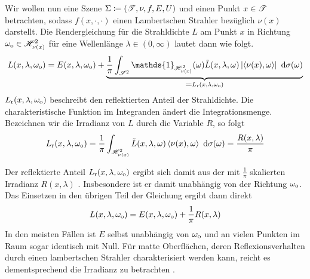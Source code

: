 		Wir wollen nun eine Szene $\Sigma\coloneqq(\mathscr{T},\nu,f,E,U)$ und einen Punkt $x\in\mathscr{T}$ betrachten, sodass $f(x,\cdot,\cdot)$ einen Lambertschen Strahler bezüglich $\nu(x)$ darstellt.
		Die Rendergleichung für die Strahldichte $L$ am Punkt $x$ in Richtung $\omega_{\mathrm{o}}\in\mathscr{H}^{2}_{\nu(x)}$ für eine Wellenlänge $\lambda\in(0,\infty)$ lautet dann wie folgt.
		\[
			L(x,\lambda,\omega_\m{o}) = E(x,\lambda,\omega_\m{o}) + \underbrace{\frac{1}{\pi} \integral{\ssp}{}{\mathds{1}_{\shs{\nu(x)}}(\omega) \tilde{L}(x,\lambda,\omega) \abs{\dotp{\nu(x)}{\omega}} }{\sigma(\omega)}}_{\definedby L_\m{r}(x,\lambda,\omega_\m{o})}
		\]
		$L_{\mathrm{r}}(x,\lambda,\omega_{\mathrm{o}})$ beschreibt den reflektierten Anteil der Strahldichte.
		Die charakteristische Funktion im Integranden ändert die Integrationsmenge.
		Bezeichnen wir die Irradianz von $L$ durch die Variable $R$, so folgt
		\[
			L_{\mathrm{r}}(x,\lambda,\omega_{\mathrm{o}}) = \frac{1}{\pi} \int_{\mathscr{H}^{2}_{\nu(x)}}^{} \tilde{L}(x,\lambda,\omega) \left\langle \nu(x),\omega \right\rangle\ \mathrm{d} \sigma(\omega) = \frac{R(x,\lambda)}{\pi}
		\]

		Der reflektierte Anteil $L_{\mathrm{r}}(x,\lambda,\omega_{\mathrm{o}})$ ergibt sich damit aus der mit $\frac{1}{\pi}$ skalierten Irradianz $R(x,\lambda)$ \cite[S.~785~f]{pbrt2}.
		Insbesondere ist er damit unabhängig von der Richtung $\omega_{\mathrm{o}}$.
		Das Einsetzen in den übrigen Teil der Gleichung ergibt dann direkt
		\[
			L(x,\lambda,\omega_{\mathrm{o}}) = E(x,\lambda,\omega_{\mathrm{o}}) + \frac{1}{\pi}R(x,\lambda)
		\]
		In den meisten Fällen ist $E$ selbst unabhängig von $\omega_{\mathrm{o}}$ und an vielen Punkten im Raum sogar identisch mit Null.
		Für matte Oberflächen, deren Reflexionsverhalten durch einen lambertschen Strahler charakterisiert werden kann, reicht es dementsprechend die Irradianz zu betrachten \cite{irr-grad,irradiance-caching}.


